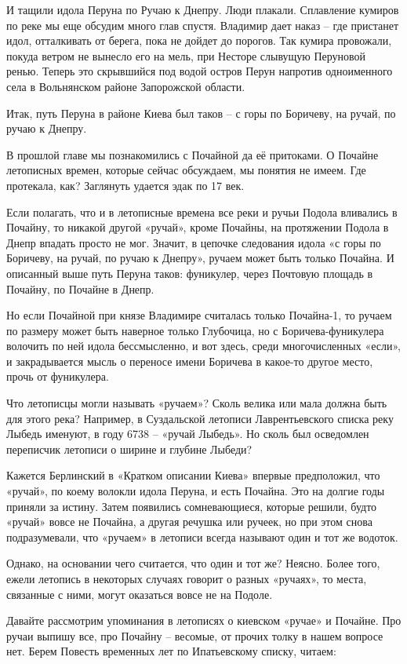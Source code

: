 И тащили идола Перуна по Ручаю к Днепру. Люди плакали. Сплавление кумиров по реке мы еще обсудим много глав спустя. Владимир дает наказ – где пристанет идол, отталкивать от берега, пока не дойдет до порогов. Так кумира провожали, покуда ветром не вынесло его на мель, при Несторе слывущую Перуновой ренью. Теперь это скрывшийся под водой остров Перун напротив одноименного села в Вольнянском районе Запорожской области.
 
Итак, путь Перуна в районе Киева был таков – с горы по Боричеву, на ручай, по ручаю к Днепру.

В прошлой главе мы познакомились с Почайной да её притоками. О Почайне летописных времен, которые сейчас обсуждаем, мы понятия не имеем. Где протекала, как? Заглянуть удается эдак по 17 век.

Если полагать, что и в летописные времена все реки и ручьи Подола вливались в Почайну, то никакой другой «ручай», кроме Почайны, на протяжении Подола в Днепр впадать просто не мог. Значит, в цепочке следования идола «с горы по Боричеву, на ручай, по ручаю к Днепру», ручаем может быть только Почайна. И описанный выше путь Перуна таков: фуникулер, через Почтовую площадь в Почайну, по Почайне в Днепр.

Но если Почайной при князе Владимире считалась только Почайна-1, то ручаем по размеру может быть наверное только Глубочица, но с Боричева-фуникулера волочить по ней идола бессмысленно, и вот здесь, среди многочисленных «если», и закрадывается мысль о переносе имени Боричева в какое-то другое место, прочь от фуникулера.

Что летописцы могли называть «ручаем»? Сколь велика или мала должна быть для этого река? Например, в Суздальской летописи Лаврентьевского списка реку Лыбедь именуют, в году 6738 – «ручай Лыбедь». Но сколь был осведомлен переписчик летописи о ширине и глубине Лыбеди?

Кажется Берлинский в «Кратком описании Киева» впервые предположил, что «ручай», по коему волокли идола Перуна, и есть Почайна. Это на долгие годы приняли за истину. Затем появились сомневающиеся, которые решили, будто «ручай» вовсе не Почайна, а другая речушка или ручеек, но при этом снова подразумевали, что «ручаем» в летописи всегда называют один и тот же водоток.

Однако, на основании чего считается, что один и тот же? Неясно. Более того, ежели летопись в некоторых случаях говорит о разных «ручаях», то места, связанные с ними, могут оказаться вовсе не на Подоле.

Давайте рассмотрим упоминания в летописях о киевском «ручае» и Почайне. Про ручаи выпишу все, про Почайну – весомые, от прочих толку в нашем вопросе нет. Берем Повесть временных лет по Ипатьевскому списку, читаем:

